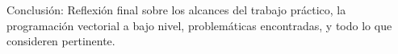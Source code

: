 Conclusión: Reflexión final sobre los alcances del trabajo práctico, la programación vectorial a bajo nivel, problemáticas encontradas, y todo lo que consideren pertinente.
